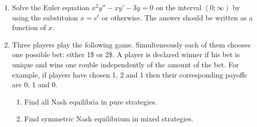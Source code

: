 \documentclass[12pt,a4paper]{article}
\begin{document}
\begin{enumerate}[resume]


\item Solve the Euler equation $x^2y'' - xy' - 3y = 0$ on the interval $(0;\infty)$ by using the substituion $x=e^t$ or otherwise. The answer should be written as a function of $x$.

\item Three players play the following game. Simulteneously each of them chooses one possible bet: either 1\$ or 2\$. A player is declared winner if his bet is unique and wins one rouble independently of the amount of the bet. For example, if players have chosen 1, 2 and 1 then their corresponding payoffs are 0, 1 and 0.

\begin{enumerate}
  \item Find all Nash equilibria in pure strategies.
  \item Find symmetric Nash equilibrium in mixed strategies.
\end{enumerate}

\end{enumerate}
\end{document}
